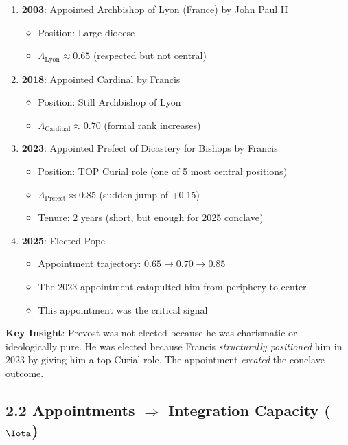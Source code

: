 \documentclass[11pt]{article}
\begin{document}
\begin{enumerate}
\item \textbf{2003}: Appointed Archbishop of Lyon (France) by John Paul II
	\begin{itemize}
	\item Position: Large diocese
	\item $\Lambda_{\text{Lyon}} \approx 0.65$ (respected but not central)
	\end{itemize}

\item \textbf{2018}: Appointed Cardinal by Francis
	\begin{itemize}
	\item Position: Still Archbishop of Lyon
	\item $\Lambda_{\text{Cardinal}} \approx 0.70$ (formal rank increases)
	\end{itemize}

\item \textbf{2023}: Appointed Prefect of Dicastery for Bishops by Francis
	\begin{itemize}
	\item Position: TOP Curial role (one of 5 most central positions)
	\item $\Lambda_{\text{Prefect}} \approx 0.85$ (sudden jump of +0.15)
	\item Tenure: 2 years (short, but enough for 2025 conclave)
	\end{itemize}

\item \textbf{2025}: Elected Pope
	\begin{itemize}
	\item Appointment trajectory: $0.65 \to 0.70 \to 0.85$
	\item The 2023 appointment catapulted him from periphery to center
	\item This appointment was the critical signal
	\end{itemize}
\end{enumerate}

\textbf{Key Insight}: Prevost was not elected because he was charismatic or ideologically pure. He was elected because Francis \textit{structurally positioned} him in 2023 by giving him a top Curial role. The appointment \textit{created} the conclave outcome.

\subsection{2.2 Appointments $\Rightarrow$ Integration Capacity ($\Iota$)}
\end{document}
